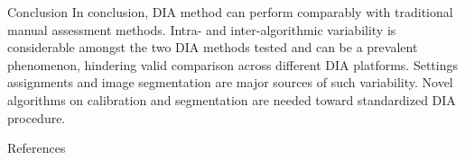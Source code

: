 \documentclass[final]{beamer}
\newlength{\onecolwid}
\begin{document}
\begin{frame}[t]
\begin{columns}[t]
\begin{column}{\onecolwid}
\begin{block}{Conclusion}
In conclusion, DIA method can perform comparably with traditional manual assessment methods. Intra- and inter-algorithmic variability is considerable amongst the two DIA methods tested and can be a prevalent phenomenon, hindering valid comparison across different DIA platforms. Settings assignments and image segmentation are major sources of such variability. Novel algorithms on calibration and segmentation are needed toward standardized DIA procedure.

\end{block}


\begin{block}{References}
\renewcommand*{\bibfont}{\tiny}
\printbibliography
\end{block}

\end{column}


\end{columns} %

\end{frame} %
\end{document}
